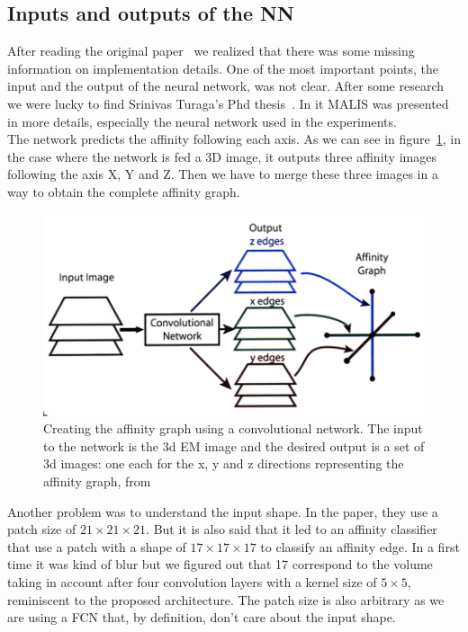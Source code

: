 \subsection{Inputs and outputs of the NN}

After reading the original paper~\cite{turaga_maximin_2009} we realized that
there was some missing information on implementation details.
One of the most important points, the input and the output of the neural
network, was not clear. After some research we were lucky to find Srinivas
Turaga's Phd thesis~\cite{turaga_learning_2010}. In it MALIS was presented in
more details, especially the neural network used in the experiments.\\

The network predicts the affinity following each axis. As we can see in
figure~\ref{fig:nn_output}, in the case where the network is fed a 3D image, it
outputs three affinity images following the axis X, Y and Z. Then we have to
merge these three images in a way to obtain the complete affinity graph.

\begin{figure}[!htbp]
	\centering
	\includegraphics[width=0.8\linewidth]{./images/nn_output.png}
	\caption{Creating the affinity graph using a convolutional network. The
	input to the network is the 3d EM image and the desired output is a set of
3d images: one each for the x, y and z directions representing the affinity
graph, from~\cite{turaga_learning_2010}}%
	\label{fig:nn_output}
\end{figure}

Another problem was to understand the input shape. In the paper, they use a
patch size of $21\times21\times21$. But it is also said that it led to an affinity
classifier that use a patch with a shape of $17\times17\times17$ to classify an affinity
edge. In a first time it was kind of blur but we figured out that 17 correspond
to the volume taking in account after four convolution layers with a kernel
size of $5\times5$, reminiscent to the proposed architecture. The patch size is also arbitrary as we are using a FCN that, by definition, don’t care about the input shape.\\

